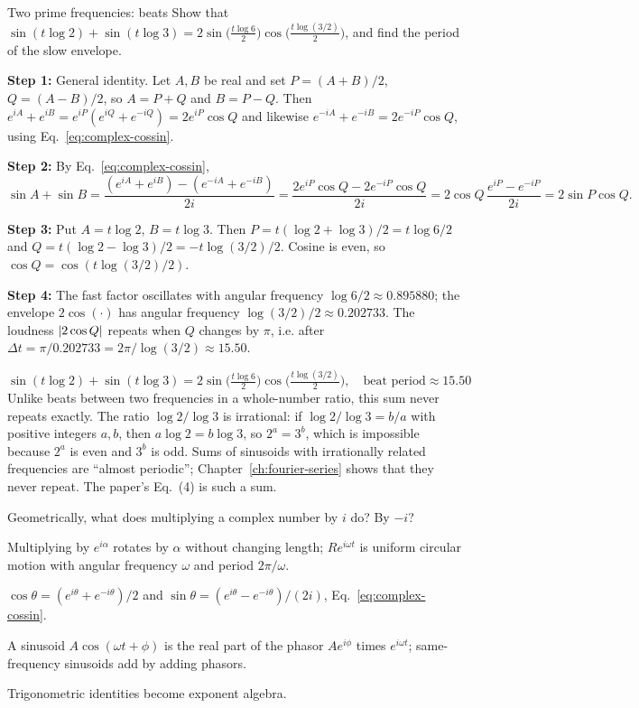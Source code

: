 \begin{sample}{Two prime frequencies: beats}
Show that $\sin(t\log2)+\sin(t\log3)=2\sin\!\bigl(\tfrac{t\log6}{2}\bigr)\cos\!\bigl(\tfrac{t\log(3/2)}{2}\bigr)$, and find the period of the slow envelope.

\textbf{Step 1:} General identity. Let $A,B$ be real and set $P=(A+B)/2$, $Q=(A-B)/2$, so $A=P+Q$ and $B=P-Q$. Then
$e^{iA}+e^{iB}=e^{iP}(e^{iQ}+e^{-iQ})=2e^{iP}\cos Q$ and likewise $e^{-iA}+e^{-iB}=2e^{-iP}\cos Q$, using Eq.~\eqref{eq:complex-cossin}.

\textbf{Step 2:} By Eq.~\eqref{eq:complex-cossin},
\[
\sin A+\sin B=\frac{(e^{iA}+e^{iB})-(e^{-iA}+e^{-iB})}{2i}=\frac{2e^{iP}\cos Q-2e^{-iP}\cos Q}{2i}=2\cos Q\,\frac{e^{iP}-e^{-iP}}{2i}=2\sin P\cos Q .
\]

\textbf{Step 3:} Put $A=t\log2$, $B=t\log3$. Then $P=t(\log2+\log3)/2=t\log6/2$ and $Q=t(\log2-\log3)/2=-t\log(3/2)/2$. Cosine is even, so $\cos Q=\cos(t\log(3/2)/2)$.

\textbf{Step 4:} The fast factor oscillates with angular frequency $\log6/2\approx0.895880$; the envelope $2\cos(\cdot)$ has angular frequency $\log(3/2)/2\approx0.202733$. The loudness $\left\lvert 2\cos Q\right\rvert$ repeats when $Q$ changes by $\pi$, i.e. after $\Delta t=\pi/0.202733=2\pi/\log(3/2)\approx15.50$.

\[
\boxed{\sin(t\log2)+\sin(t\log3)=2\sin\!\bigl(\tfrac{t\log 6}{2}\bigr)\cos\!\bigl(\tfrac{t\log(3/2)}{2}\bigr),\quad\text{beat period}\approx15.50}
\]
Unlike beats between two frequencies in a whole-number ratio, this sum never repeats exactly. The ratio $\log 2/\log 3$ is irrational: if $\log2/\log3=b/a$ with positive integers $a,b$, then $a\log2=b\log3$, so $2^a=3^b$, which is impossible because $2^a$ is even and $3^b$ is odd. Sums of sinusoids with irrationally related frequencies are ``almost periodic''; Chapter~\ref{ch:fourier-series} shows that they never repeat. The paper's Eq.~(4) is such a sum.
\end{sample}

\begin{checkpoint}
Geometrically, what does multiplying a complex number by $i$ do? By $-i$?
\end{checkpoint}

\begin{keyideas}
\item Multiplying by $e^{i\alpha}$ rotates by $\alpha$ without changing length; $Re^{i\omega t}$ is uniform circular motion with angular frequency $\omega$ and period $2\pi/\omega$.
\item $\cos\theta=(e^{i\theta}+e^{-i\theta})/2$ and $\sin\theta=(e^{i\theta}-e^{-i\theta})/(2i)$, Eq.~\eqref{eq:complex-cossin}.
\item A sinusoid $A\cos(\omega t+\phi)$ is the real part of the phasor $Ae^{i\phi}$ times $e^{i\omega t}$; same-frequency sinusoids add by adding phasors.
\item Trigonometric identities become exponent algebra.
\end{keyideas}

